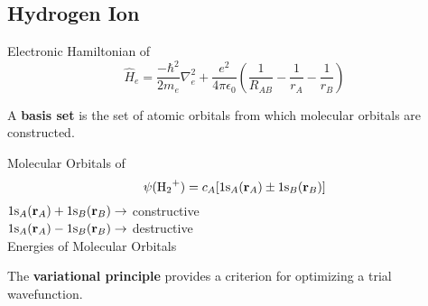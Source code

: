 \subsection*{Hydrogen Ion }

Electronic Hamiltonian of 
\begin{equation*}
    \hat{H}_e = \frac{-\hbar^2}{2m_e}\nabla^2_e + \frac{e^2}{4\pi\epsilon_0} \left( \frac{1}{R_{AB}} - \frac{1}{r_{A}} - \frac{1}{r_{B}} \right)
\end{equation*}

A \textbf{basis set} is the set of atomic orbitals from which molecular orbitals are constructed.

Molecular Orbitals of 
\begin{equation*}
    \psi(\ce{H2+}) = c_A[1\ce{s_}_A (\mathbf{r}_A) \pm 1\ce{s_}_B (\mathbf{r}_B)]
  \end{equation*}
$1\ce{s_}_A (\mathbf{r}_A) + 1\ce{s_}_B (\mathbf{r}_B) \rightarrow$ constructive \\
$1\ce{s_}_A (\mathbf{r}_A) - 1\ce{s_}_B (\mathbf{r}_B) \rightarrow$ destructive \\

Energies of  Molecular Orbitals


The \textbf{variational principle} provides a criterion for optimizing a trial wavefunction.

